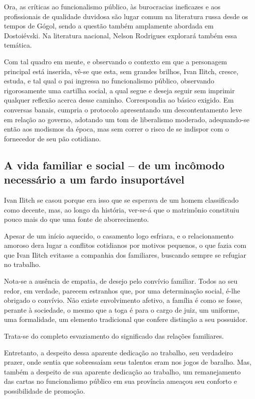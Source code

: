 \documentclass[12pt]{extarticle}
\begin{document}
Ora, as críticas ao funcionalismo público, às burocracias ineficazes e
aos profissionais de qualidade duvidosa são lugar comum na literatura
russa desde os tempos de Gógol, sendo a questão também amplamente
abordada em Dostoiévski. Na literatura nacional, Nelson Rodrigues
explorará também essa temática.

Com tal quadro em mente, e observando o contexto em que a personagem
principal está inserida, vê-se que esta, sem grandes brilhos, Ivan
Ilitch, cresce, estuda, e tal qual o pai ingressa no funcionalismo
público, observando rigorosamente uma cartilha social, a qual segue e
deseja seguir sem imprimir qualquer reflexão acerca desse caminho.
Correspondia ao básico exigido. Em conversas banais, cumpria o protocolo
apresentando um descontentamento leve em relação ao governo, adotando um
tom de liberalismo moderado, adequando-se então aos modismos da época,
mas sem correr o risco de se indispor com o fornecedor de seu pão
cotidiano.

\subsection{A vida familiar e social -- de um incômodo necessário a um fardo
insuportável}

Ivan Ilitch se casou porque era isso que se esperava de um homem
classificado como decente, mas, ao longo da história, ver-se-á que o
matrimônio constituiu pouco mais do que uma fonte de aborrecimento.

Apesar de um início aquecido, o casamento logo esfriara, e o
relacionamento amoroso dera lugar a conflitos cotidianos por motivos
pequenos, o que fazia com que Ivan Ilitch evitasse a companhia dos
familiares, buscando sempre se refugiar no trabalho.

Nota-se a ausência de empatia, de desejo pelo convívio familiar. Todos
ao seu redor, em verdade, parecem estranhos que, por uma determinação
social, é-lhe obrigado o convívio. Não existe envolvimento afetivo, a
família é como se fosse, perante à sociedade, o mesmo que a toga é para
o cargo de juiz, um uniforme, uma formalidade, um elemento tradicional
que confere distinção a seu possuidor.

Trata-se do completo esvaziamento do significado das relações
familiares.

Entretanto, a despeito dessa aparente dedicação ao trabalho, seu
verdadeiro prazer, onde sentia que sobressaíam seus talentos eram nos
jogos de baralho. Mas, também a despeito de sua aparente dedicação ao
trabalho, um remanejamento das cartas no funcionalismo público em sua
província ameaçou seu conforto e possibilidade de promoção.
\end{document}
